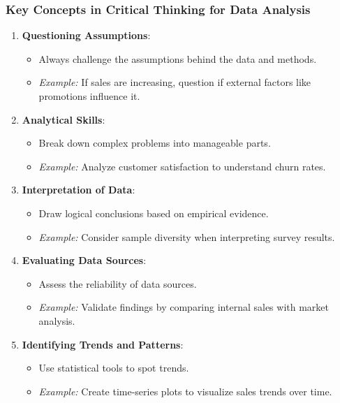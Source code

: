 \documentclass[aspectratio=169]{beamer}
\begin{document}
\begin{frame}[fragile]
    \frametitle{Key Concepts in Critical Thinking for Data Analysis}
    \begin{enumerate}
        \item \textbf{Questioning Assumptions}:
            \begin{itemize}
                \item Always challenge the assumptions behind the data and methods.
                \item \textit{Example:} If sales are increasing, question if external factors like promotions influence it.
            \end{itemize}
        
        \item \textbf{Analytical Skills}:
            \begin{itemize}
                \item Break down complex problems into manageable parts.
                \item \textit{Example:} Analyze customer satisfaction to understand churn rates.
            \end{itemize}
            
        \item \textbf{Interpretation of Data}:
            \begin{itemize}
                \item Draw logical conclusions based on empirical evidence.
                \item \textit{Example:} Consider sample diversity when interpreting survey results.
            \end{itemize}
        
        \item \textbf{Evaluating Data Sources}:
            \begin{itemize}
                \item Assess the reliability of data sources.
                \item \textit{Example:} Validate findings by comparing internal sales with market analysis.
            \end{itemize}
        
        \item \textbf{Identifying Trends and Patterns}:
            \begin{itemize}
                \item Use statistical tools to spot trends.
                \item \textit{Example:} Create time-series plots to visualize sales trends over time.
            \end{itemize}
    \end{enumerate}
\end{frame}
\end{document}
